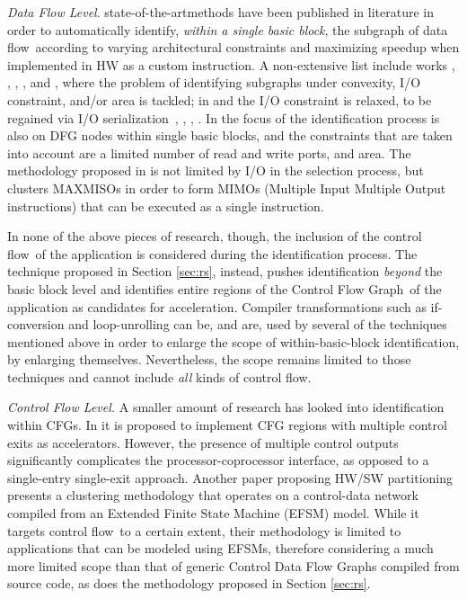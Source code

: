\documentclass[]{usiinfthesis}
\newcommand{\SoTA}{{state-of-the-art}}
\newcommand{\dataflow}{data flow}
\newcommand{\controlflow}{control flow}
\newcommand{\CFG}{Control Flow Graph}
\begin{document}
\emph{Data Flow Level}.
\SoTA methods have been
published in literature in order to automatically identify,
\emph{within a single basic block}, the subgraph of \dataflow\ 
according to varying architectural constraints and maximizing speedup
when implemented in HW as a custom instruction. A non-extensive list
include works \cite{YuSep04}, \cite{PozziJul06}, \cite{ChenFeb07},
\cite{ReddingtonAug09}, \cite{GiaquintaMar15} and \cite{MartiFeb12},
where the problem of identifying subgraphs under convexity, I/O
constraint, and/or area is tackled; in \cite{VermaOct07} and
\cite{PothineniJan07} the I/O constraint is relaxed, to be regained
via I/O serialization~\cite{PozziSep05}, \cite{VermaOct07},
\cite{AtasuApr07}, \cite{AhnJan13}. In \cite{CongFeb04} the focus of
the identification process is also on DFG nodes within single basic
blocks, and the constraints that are taken into account are a limited
number of read and write ports, and area.  The methodology proposed in
\cite{GaluzziOct06} is not limited by I/O in the selection process,
but clusters MAXMISOs \cite{AlippiMar99} in order to form MIMOs 
(Multiple Input Multiple Output instructions) that can be executed as 
a single instruction.\par

In none of the above pieces of research, though, the inclusion of the
\controlflow\ of the application is considered during the
identification process. The technique proposed in Section \ref{sec:rs}, 
instead, pushes 
identification \emph{beyond} the basic block level and identifies 
entire regions of the \CFG\ of the
application as candidates for acceleration. Compiler
transformations such as if-conversion and loop-unrolling can be, and
are, used by several of the techniques mentioned above in order to
enlarge the scope of within-basic-block identification, by enlarging 
themselves. Nevertheless, the scope remains limited to those
techniques and cannot include \emph{all} kinds of
\controlflow.\par

\emph{Control Flow Level.}
A smaller amount of research has looked into
identification within CFGs. In \cite{ZuluagaJul09} it is
proposed to implement CFG regions with multiple control exits as
accelerators. However, the presence of multiple control outputs
significantly complicates the processor-coprocessor interface, as
opposed to a single-entry single-exit approach. 
Another paper proposing HW/SW partitioning~\cite{BaleaniMay02}
presents a clustering methodology that operates on a control-data
network compiled from an Extended Finite State Machine (EFSM)
model. While it targets \controlflow\ to a certain extent, their
methodology is limited to applications that can be modeled using
EFSMs, therefore considering a much more limited scope than that of
generic Control Data Flow Graphs compiled from source code, as does 
the methodology proposed in Section \ref{sec:rs}.
\end{document}
